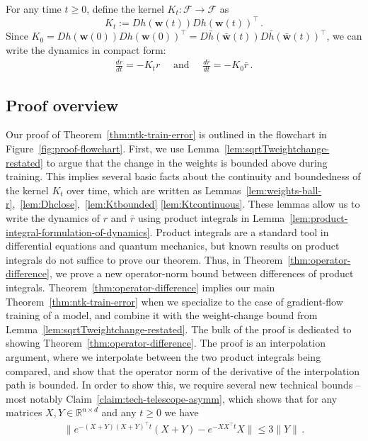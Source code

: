 \documentclass[11pt]{article} %
\newcommand{\R}{\mathbb{R}}
\newcommand{\<}{\langle}
\renewcommand{\>}{\rangle}
\def\bw{{\boldsymbol w}}
\def\cF{{\mathcal F}}
\def\cF{{\mathcal F}}
\theoremstyle{plain}
\theoremstyle{definition}
\theoremstyle{remark}
\begin{document}
For any time $t \geq 0$, define the kernel $K_t : \cF \to \cF$ as $$K_t := Dh(\bw(t))Dh(\bw(t))^{\top}\,.$$ Since $K_0 = Dh(\bw(0))Dh(\bw(0))^{\top} = D\bar h(\bar\bw(t)) D\bar h(\bar\bw(t))^{\top}$, we can write the dynamics in compact form:
\begin{align}\label{eq:residual-dynamics}
\frac{dr}{dt} = -K_t r \quad \mbox{ and }\quad \frac{d\bar r}{dt} = -K_0 \bar{r}\,.
\end{align}

\subsection{Proof overview}

Our proof of Theorem~\ref{thm:ntk-train-error} is outlined in the flowchart in Figure~\ref{fig:proof-flowchart}. First, we use Lemma~\ref{lem:sqrtTweightchange-restated} to argue that the change in the weights is bounded above during training. This implies several basic facts about the continuity and boundedness of the kernel $K_t$ over time, which are written as Lemmas~\ref{lem:weights-ball-r},~\ref{lem:Dhclose},~\ref{lem:Ktbounded} \ref{lem:Ktcontinuous}. These lemmas allow us to write the dynamics of $r$ and $\bar{r}$ using product integrals \cite{dollard_friedman_1984} in Lemma~\ref{lem:product-integral-formulation-of-dynamics}. Product integrals are a standard tool in differential equations and quantum mechanics, but known results on product integrals do not suffice to prove our theorem. Thus, in Theorem~\ref{thm:operator-difference}, we prove a new operator-norm bound between differences of product integrals. Theorem~\ref{thm:operator-difference} implies our main Theorem~\ref{thm:ntk-train-error} when we specialize to the case of gradient-flow training of a model, and combine it with the weight-change bound from Lemma~\ref{lem:sqrtTweightchange-restated}. The bulk of the proof is dedicated to showing Theorem~\ref{thm:operator-difference}. The proof is an interpolation argument, where we interpolate between the two product integrals being compared, and show that the operator norm of the derivative of the interpolation path is bounded. In order to show this, we require several new technical bounds -- most notably Claim~\ref{claim:tech-telescope-asymm}, which shows that for any matrices $X,Y \in \R^{n \times d}$ and any $t \geq 0$ we have
\begin{align*}
\|e^{-(X+Y)(X+Y)^{\top} t} (X+Y) - e^{-XX^{\top}t}X\| \leq 3\|Y\|\,.
\end{align*}
\end{document}
